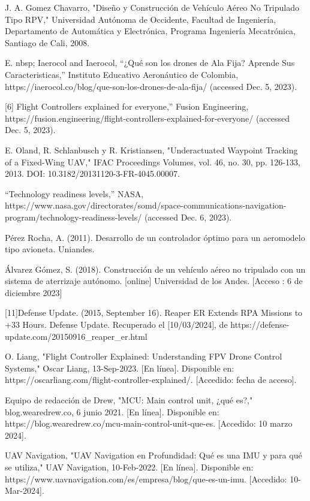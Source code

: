 \documentclass[journal,onecolumn]{IEEEtran}
\begin{document}
\begin{thebibliography}{20}
J. A. Gomez Chavarro, "Diseño y Construcción de Vehículo Aéreo No Tripulado Tipo RPV," Universidad Autónoma de Occidente, Facultad de Ingeniería, Departamento de Automática y Electrónica, Programa Ingeniería Mecatrónica, Santiago de Cali, 2008.


 E. nbsp; 	Iaerocol and Iaerocol, “¿Qué son los drones de Ala Fija? Aprende Sus Caracteristicas,” Instituto Educativo Aeronáutico de Colombia, https://iaerocol.co/blog/que-son-los-drones-de-ala-fija/ (accessed Dec. 5, 2023). 

[6] Flight Controllers explained for everyone,” Fusion Engineering, https://fusion.engineering/flight-controllers-explained-for-everyone/ (accessed Dec. 5, 2023). 
    
 E. Oland, R. Schlanbusch y R. Kristiansen, "Underactuated Waypoint Tracking of a Fixed-Wing UAV," IFAC Proceedings Volumes, vol. 46, no. 30, pp. 126-133, 2013. DOI: 10.3182/20131120-3-FR-4045.00007.


“Technology readiness levels,” NASA, https://www.nasa.gov/directorates/somd/space-communications-navigation-program/technology-readiness-levels/ (accessed Dec. 6, 2023). 

 Pérez Rocha, A.  (2011). Desarrollo de un controlador óptimo para un aeromodelo tipo avioneta. Uniandes. 
   
Álvarez Gómez, S.  (2018). Construcción de un vehículo aéreo no tripulado con un sistema de aterrizaje autónomo. [online]  Universidad de los Andes.  [Acceso : 6 de diciembre 2023]

[11]Defense Update. (2015, September 16). Reaper ER Extends RPA Missions to +33 Hours. Defense Update. Recuperado el [10/03/2024], de https://defense-update.com/20150916\_reaper\_er.html

 O. Liang, "Flight Controller Explained: Understanding FPV Drone Control Systems," Oscar Liang, 13-Sep-2023. [En línea]. Disponible en: https://oscarliang.com/flight-controller-explained/. [Accedido: fecha de acceso].

Equipo de redacción de Drew, "MCU: Main control unit, ¿qué es?," blog.wearedrew.co, 6 junio 2021. [En línea]. Disponible en: https://blog.wearedrew.co/mcu-main-control-unit-que-es. [Accedido: 10 marzo 2024].

UAV Navigation, "UAV Navigation en Profundidad: Qué es una IMU y para qué se utiliza," UAV Navigation, 10-Feb-2022. [En línea]. Disponible en: https://www.uavnavigation.com/es/empresa/blog/que-es-un-imu. [Accedido: 10-Mar-2024].


\end{thebibliography}
\end{document}
